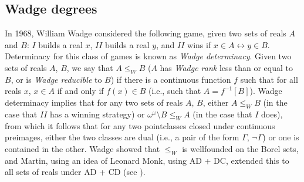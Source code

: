 \documentclass{book}%
\begin{document}




\subsection{Wadge degrees}

In 1968, William Wadge considered the following game, given two sets of
reals $A$ and $B$: $I$ builds a real $x$, $II$ builds a real $y$,
and $II$ wins if $x \in A \leftrightarrow y \in B$. Determinacy for
this class of games is known as \emph{Wadge determinacy}. Given two
sets of reals $A$, $B$, we say that $A\leq_{W} B$ ($A$ has
\emph{Wadge rank} less than or equal to $B$, or is \emph{Wadge
reducible} to $B$) if there is a continuous function $f$ such that
for all reals $x$, $x \in A$ if and only if $f(x) \in B$ (i.e., such that $A =
f^{-1}[B]$).  Wadge
determinacy implies that for any two sets of reals $A$, $B$, either
$A \leq_{W} B$ (in the case that $II$ has a winning strategy) or $\omega^{\omega} \setminus B \leq_{W} A$
(in the case that $I$ does), from which it follows that for any two
pointclasses closed under continuous preimages, either the two classes are dual (i.e., a pair of the form
$\Gamma$, $\neg\Gamma$) or one is contained in
the other. Wadge
showed that $\leq_{W}$ is wellfounded on the Borel sets, and Martin, using an 
idea of Leonard Monk, using AD + DC, extended this to all sets of reals under 
AD + CD (see \cite{VanWesep:1978Wadge}).
\end{document}

